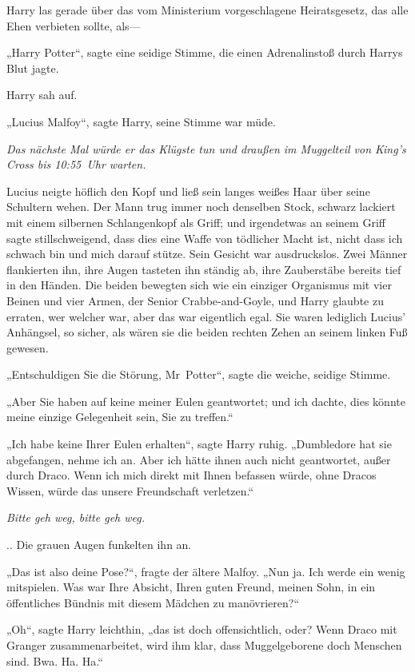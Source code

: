 {Harry las gerade über das vom Ministerium vorgeschlagene Heiratsgesetz, das alle Ehen verbieten sollte, als—

„Harry Potter“, sagte eine seidige Stimme, die einen Adrenalinstoß durch Harrys Blut jagte.

Harry sah auf.

„Lucius Malfoy“, sagte Harry, seine Stimme war müde.

\emph{Das nächste Mal würde er das Klügste tun und draußen im Muggelteil von King's Cross bis 10:55~Uhr warten.}

Lucius neigte höflich den Kopf und ließ sein langes weißes Haar über seine Schultern wehen. Der Mann trug immer noch denselben Stock, schwarz lackiert mit einem silbernen Schlangenkopf als Griff; und irgendetwas an seinem Griff sagte stillschweigend, dass dies eine Waffe von tödlicher Macht ist, nicht dass ich schwach bin und mich darauf stütze. Sein Gesicht war ausdruckslos. Zwei Männer flankierten ihn, ihre Augen tasteten ihn ständig ab, ihre Zauberstäbe bereits tief in den Händen. Die beiden bewegten sich wie ein einziger Organismus mit vier Beinen und vier Armen, der Senior Crabbe-and-Goyle, und Harry glaubte zu erraten, wer welcher war, aber das war eigentlich egal. Sie waren lediglich Lucius' Anhängsel, so sicher, als wären sie die beiden rechten Zehen an seinem linken Fuß gewesen.

„Entschuldigen Sie die Störung, Mr~Potter“, sagte die weiche, seidige Stimme.

„Aber Sie haben auf keine meiner Eulen geantwortet; und ich dachte, dies könnte meine einzige Gelegenheit sein, Sie zu treffen.“

„Ich habe keine Ihrer Eulen erhalten“, sagte Harry ruhig. „Dumbledore hat sie abgefangen, nehme ich an. Aber ich hätte ihnen auch nicht geantwortet, außer durch Draco. Wenn ich mich direkt mit Ihnen befassen würde, ohne Dracos Wissen, würde das unsere Freundschaft verletzen.“

\emph{Bitte geh weg, bitte geh weg.}

.. Die grauen Augen funkelten ihn an.

„Das ist also deine Pose?“, fragte der ältere Malfoy. „Nun ja. Ich werde ein wenig mitspielen. Was war Ihre Absicht, Ihren guten Freund, meinen Sohn, in ein öffentliches Bündnis mit diesem Mädchen zu manövrieren?“

„Oh“, sagte Harry leichthin, „das ist doch offensichtlich, oder? Wenn Draco mit Granger zusammenarbeitet, wird ihm klar, dass Muggelgeborene doch Menschen sind. Bwa. Ha. Ha.“

}
